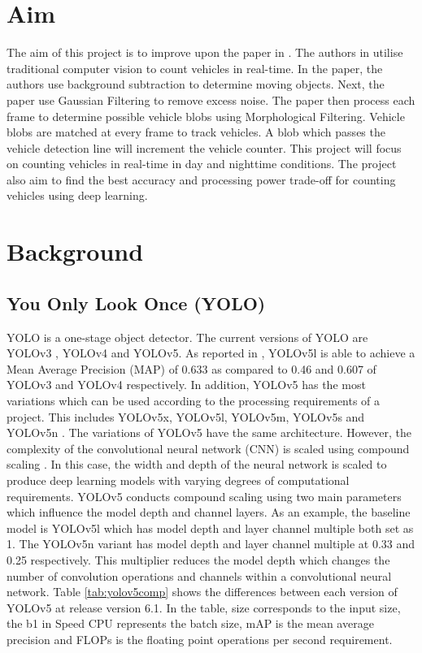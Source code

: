 \documentclass[12pt,a4paper,fleqn]{report}
\begin{document}
\section{Aim}
The aim of this project is to improve upon the paper in \cite{rcvavc:2019}. 
The authors in \cite{rcvavc:2019} utilise traditional computer vision to count vehicles in real-time. 
In the paper, the authors use background subtraction to determine moving objects. 
Next, the paper use Gaussian Filtering to remove excess noise.
The paper then process each frame to determine possible vehicle blobs using Morphological
Filtering.
Vehicle blobs are matched at every frame to track vehicles. 
A blob which passes the vehicle detection line will increment the vehicle counter.
This project will focus on counting vehicles in real-time in day and nighttime
conditions. 
The project also aim to find the best accuracy and processing power trade-off for counting
vehicles using deep learning.


\section{Background}

\subsection{You Only Look Once (YOLO)}
YOLO is a one-stage object detector.
The current versions of YOLO are YOLOv3 \cite{yolov3:2018}, YOLOv4 \cite{yolov4:2020} and YOLOv5.
As reported in \cite{compareyolo345:2022}, YOLOv5l is able to achieve a Mean Average Precision (MAP) of 0.633 as compared to 0.46 and 0.607 of YOLOv3 and YOLOv4 respectively. 
In addition, YOLOv5 has the most variations which can be used according to the processing requirements of a
project.
This includes YOLOv5x, YOLOv5l, YOLOv5m, YOLOv5s and YOLOv5n \cite{yolov5git:2022}.
The variations of YOLOv5 have the same architecture. 
However, the complexity of the convolutional neural network (CNN) is scaled using compound scaling
\cite{efficentdet:2019,efficientnet:2019}. 
In this case, the width and depth of the neural network is scaled to produce deep learning models
with varying degrees of computational requirements. 
YOLOv5 conducts compound scaling using two main parameters which influence the model depth and
channel layers. 
As an example, the baseline model is YOLOv5l which has model depth and layer channel multiple both set as
1.
The YOLOv5n variant has model depth and layer channel multiple at 0.33 and 0.25 respectively.
This multiplier reduces the model depth which changes the number of convolution operations and
channels within a convolutional neural network.
Table \ref{tab:yolov5comp} shows the differences between each version of YOLOv5 at release version 6.1. 
In the table, size corresponds to the input size, the b1 in Speed CPU represents the batch size, mAP is the mean average precision and FLOPs is the
floating point operations per second requirement. 
\end{document}
